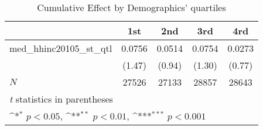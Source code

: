 \begin{table}[htbp]\centering
\def\sym#1{\ifmmode^{#1}\else\(^{#1}\)\fi}
\caption{Cumulative Effect by Demographics' quartiles}
\begin{tabular}{l*{4}{c}}
\hline\hline
            &\multicolumn{1}{c}{1st}&\multicolumn{1}{c}{2nd}&\multicolumn{1}{c}{3rd}&\multicolumn{1}{c}{4rd}\\
\hline
med\_hhinc20105\_st\_qtl&      0.0756         &      0.0514         &      0.0754         &      0.0273         \\
            &      (1.47)         &      (0.94)         &      (1.30)         &      (0.77)         \\
\hline
\(N\)       &       27526         &       27133         &       28857         &       28643         \\
\hline\hline
\multicolumn{5}{l}{\footnotesize \textit{t} statistics in parentheses}\\
\multicolumn{5}{l}{\footnotesize \sym{*} \(p<0.05\), \sym{**} \(p<0.01\), \sym{***} \(p<0.001\)}\\
\end{tabular}
\end{table}

